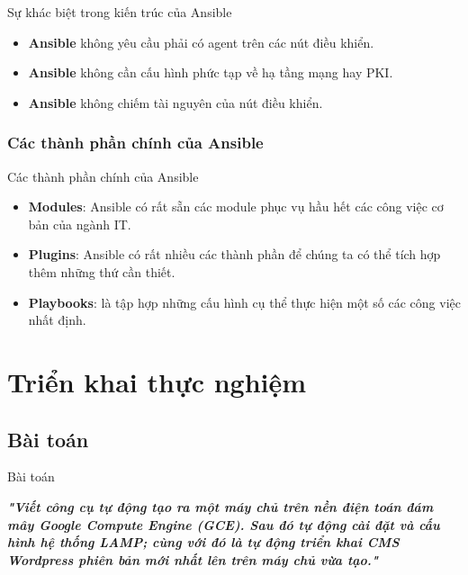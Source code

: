 \documentclass[14pt]{beamer}
\begin{document}
\begin{frame}{Sự khác biệt trong kiến trúc của Ansible}
  \begin{itemize}
    \item \textbf{Ansible} không yêu cầu phải có agent trên các nút điều khiển.
    \item \textbf{Ansible} không cần cấu hình phức tạp về hạ tầng mạng hay PKI.
    \item \textbf{Ansible} không chiếm tài nguyên của nút điều khiển.
  \end{itemize}
\renewcommand{\baselinestretch}{1.0}\normalsize
\end{frame}

\subsubsection*{Các thành phần chính của Ansible}

\begin{frame}{Các thành phần chính của Ansible}
\renewcommand{\baselinestretch}{1.20}\normalsize
\begin{itemize}
\item \textbf{Modules}: Ansible có rất sẵn các module phục vụ hầu hết các công việc cơ bản của ngành IT.
\pause
\item \textbf{Plugins}: Ansible có rất nhiều các thành phần để chúng ta có thể tích hợp thêm những thứ cần thiết.
\pause
\item \textbf{Playbooks}: là tập hợp những cấu hình cụ thể thực hiện một số các công việc nhất định.
\end{itemize}
\renewcommand{\baselinestretch}{1.0}\normalsize
\end{frame}

\section{Triển khai thực nghiệm}
\subsection{Bài toán}
\begin{frame}{Bài toán}
\renewcommand{\baselinestretch}{1.50}\normalsize
  \begin{alertblock}\justifying
    \emph{\textbf{"Viết công cụ tự động tạo ra một máy chủ trên nền điện toán đám mây Google Compute Engine (GCE). Sau đó tự động cài đặt và cấu hình hệ thống LAMP; cùng với đó là tự động triển khai CMS Wordpress phiên bản mới nhất lên trên máy chủ vừa tạo."}}
  \end{alertblock}
\renewcommand{\baselinestretch}{1.0}\normalsize
\end{frame}
\end{document}
